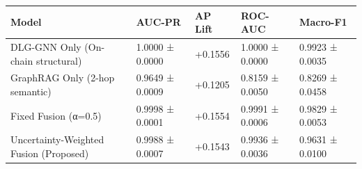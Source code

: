 \begin{tabular}{lllll}
\toprule
Model & AUC-PR & AP Lift & ROC-AUC & Macro-F1 \\
\midrule
DLG-GNN Only (On-chain structural) & 1.0000 ± 0.0000 & +0.1556 & 1.0000 ± 0.0000 & 0.9923 ± 0.0035 \\
GraphRAG Only (2-hop semantic) & 0.9649 ± 0.0009 & +0.1205 & 0.8159 ± 0.0050 & 0.8269 ± 0.0458 \\
Fixed Fusion (α=0.5) & 0.9998 ± 0.0001 & +0.1554 & 0.9991 ± 0.0006 & 0.9829 ± 0.0053 \\
Uncertainty-Weighted Fusion (Proposed) & 0.9988 ± 0.0007 & +0.1543 & 0.9936 ± 0.0036 & 0.9631 ± 0.0100 \\
\bottomrule
\end{tabular}
